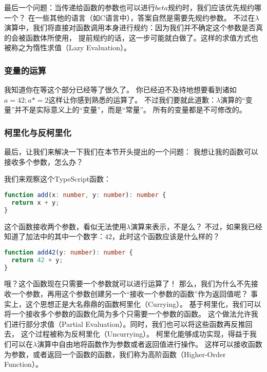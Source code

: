 \documentclass[../main.tex]{subfiles}
\begin{document}
      \indent 最后一个问题：当传递给函数的参数也可以进行$beta$规约时，我们应该优先规约哪一个？
      在一些其他的语言（如C语言中），答案自然是需要先规约参数。
      不过在$\lambda$演算中，我们将直接对函数调用本身进行规约：因为我们并不确定这个参数是否真的会被函数体所使用，
      提前规约的话，这一步可能就白做了。这样的求值方式也被称之为惰性求值（Lazy Evaluation）\cite{lazywiki}。
      
    \subsubsection*{变量的运算}
      \indent 我知道你在等这个部分已经等了很久了。
      你已经迫不及待地想要看到诸如$a = 42; a *= 2$这样让你感到熟悉的运算了。
      不过我们要就此道歉：$\lambda$演算的“变量”并不是实际意义上的“变量”，而是“常量”。
      所有的变量都是不可修改的。

    \subsubsection*{柯里化与反柯里化}
      \indent 最后，让我们来解决一下我们在本节开头提出的一个问题：
      我想让我的函数可以接收多个参数，怎么办？

      \indent 我们来观察这个TypeScript函数：

\begin{lstlisting}[language=TypeScript]
function add(x: number, y: number): number {
  return x + y;
}
\end{lstlisting}

      \indent 这个函数接收两个参数，看似无法使用$\lambda$演算来表示，不是么？
      不过，如果我已经知道了加法中的其中一个数字：$42$，此时这个函数应该是什么样的？

\begin{lstlisting}[language=TypeScript]
function add42(y: number): number {
  return 42 + y;
}
\end{lstlisting}

      \indent 哦？这个函数现在只需要一个参数就可以进行运算了！
      那么，我们为什么不先接收一个参数，再用这个参数创建另一个“接收一个参数的函数”作为返回值呢？
      事实上，这个思想正是大名鼎鼎的函数柯里化（Currying）。
      基于柯里化，我们可以将一个接收多个参数的函数化简为多个只需要一个参数的函数。
      这个做法允许我们进行部分求值（Partial Evaluation）。同时，我们也可以将这些函数再反推回去，
      这个过程被称为反柯里化（Uncurrying）\cite{currywiki}。
      柯里化能够成功实现，得益于我们可以在$\lambda$演算中自由地将函数作为参数或者返回值进行操作。
      这样可以接收函数为参数，或者返回一个函数的函数，我们称为高阶函数（Higher-Order Function）\cite{highwiki}。
\end{document}

